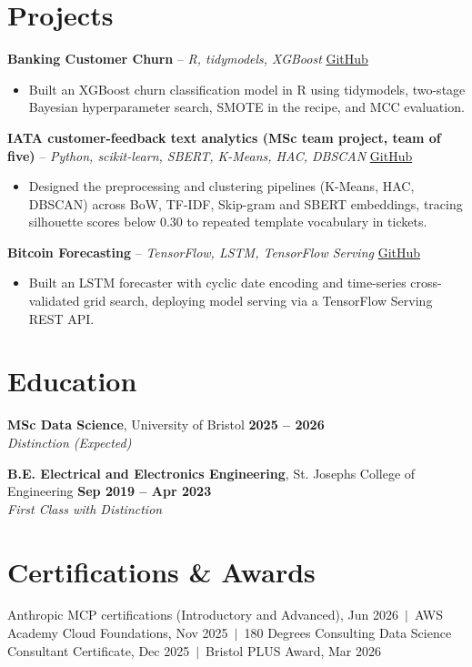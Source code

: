 \documentclass[a4paper,11pt]{article}
\begin{document}
\section{Projects}
\noindent\textbf{Banking Customer Churn} -- \textit{R, tidymodels, XGBoost} \hfill \href{https://github.com/Thiruvel-AP/Banking-Customer-Churn-Prediction}{GitHub}
\begin{itemize}
  \item Built an XGBoost churn classification model in R using tidymodels, two-stage Bayesian hyperparameter search, SMOTE in the recipe, and MCC evaluation.
\end{itemize}
\vspace{3pt}
\noindent\textbf{IATA customer-feedback text analytics (MSc team project, team of five)} -- \textit{Python, scikit-learn, SBERT, K-Means, HAC, DBSCAN} \hfill \href{https://github.com/Thiruvel-AP/TextAnalytics}{GitHub}
\begin{itemize}
  \item Designed the preprocessing and clustering pipelines (K-Means, HAC, DBSCAN) across BoW, TF-IDF, Skip-gram and SBERT embeddings, tracing silhouette scores below 0.30 to repeated template vocabulary in tickets.
\end{itemize}
\vspace{3pt}
\noindent\textbf{Bitcoin Forecasting} -- \textit{TensorFlow, LSTM, TensorFlow Serving} \hfill \href{https://github.com/Thiruvel-AP/BitcoinForecasting}{GitHub}
\begin{itemize}
  \item Built an LSTM forecaster with cyclic date encoding and time-series cross-validated grid search, deploying model serving via a TensorFlow Serving REST API.
\end{itemize}

\section{Education}
\textbf{MSc Data Science}, University of Bristol \hfill \textbf{2025 – 2026}\\ \textit{Distinction (Expected)}\par
\vspace{3pt}
\textbf{B.E. Electrical and Electronics Engineering}, St. Joseph\textquotesingle{}s College of Engineering \hfill \textbf{Sep 2019 – Apr 2023}\\ \textit{First Class with Distinction}\par

\section{Certifications \& Awards}
Anthropic MCP certifications (Introductory and Advanced), Jun 2026 \,$|$\, AWS Academy Cloud Foundations, Nov 2025 \,$|$\, 180 Degrees Consulting Data Science Consultant Certificate, Dec 2025 \,$|$\, Bristol PLUS Award, Mar 2026
\end{document}
